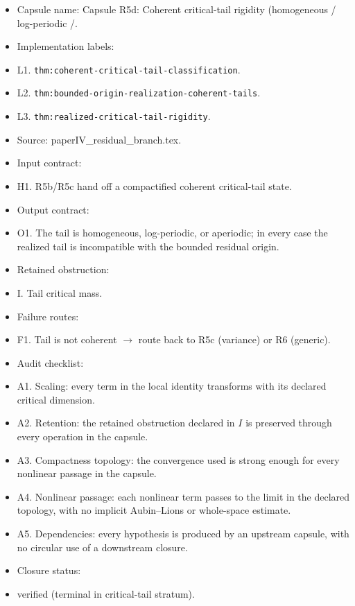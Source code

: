 \documentclass[11pt]{amsart}
\begin{document}
\begin{itemize}
  \item Capsule name: Capsule R5d: Coherent critical-tail rigidity (homogeneous / log-periodic /.
  \item Implementation labels:
  \item L1. \texttt{thm:coherent-critical-tail-classification}.
  \item L2. \texttt{thm:bounded-origin-realization-coherent-tails}.
  \item L3. \texttt{thm:realized-critical-tail-rigidity}.
  \item Source: paperIV\_residual\_branch.tex.
  \item Input contract:
  \item H1. R5b/R5c hand off a compactified coherent critical-tail state.
  \item Output contract:
  \item O1. The tail is homogeneous, log-periodic, or aperiodic; in every case the realized tail is incompatible with the bounded residual origin.
  \item Retained obstruction:
  \item I. Tail critical mass.
  \item Failure routes:
  \item F1. Tail is not coherent $\to$ route back to R5c (variance) or R6 (generic).
  \item Audit checklist:
  \item A1. Scaling: every term in the local identity transforms with its declared critical dimension.
  \item A2. Retention: the retained obstruction declared in $I$ is preserved through every operation in the capsule.
  \item A3. Compactness topology: the convergence used is strong enough for every nonlinear passage in the capsule.
  \item A4. Nonlinear passage: each nonlinear term passes to the limit in the declared topology, with no implicit Aubin--Lions or whole-space estimate.
  \item A5. Dependencies: every hypothesis is produced by an upstream capsule, with no circular use of a downstream closure.
  \item Closure status:
  \item verified (terminal in critical-tail stratum).
\end{itemize}
\end{document}
